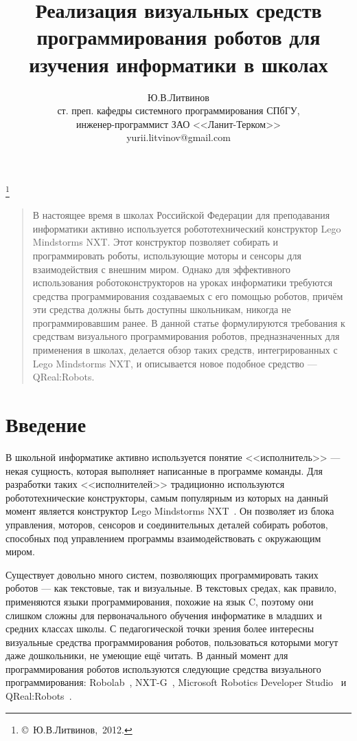 \documentclass[a4paper]{article}
\title{Реализация визуальных средств программирования роботов для изучения информатики в школах}
\author{Ю.В.Литвинов \\ ст. преп. кафедры системного программирования СПбГУ, \\ инженер-программист ЗАО <<Ланит-Терком>> \\ yurii.litvinov@gmail.com}
\date{}
\begin{document}
\maketitle
\thispagestyle{empty}

\renewcommand{\thefootnote}{}
\footnote{\small{\copyright~Ю.В.Литвинов,~2012.}}
\renewcommand{\thefootnote}{\arabic{footnote}}
\setcounter{footnote}{0}

\begin{quote}
\small\noindent
В настоящее время в школах Российской Федерации для преподавания информатики активно используется робототехнический конструктор Lego Mindstorms NXT. Этот конструктор позволяет собирать и программировать роботы, использующие моторы и сенсоры для взаимодействия с внешним миром. Однако для эффективного использования роботоконструкторов на уроках информатики требуются средства программирования создаваемых с его помощью роботов, причём эти средства должны быть доступны школьникам, никогда не программировавшим ранее. В данной статье формулируются требования к средствам визуального программирования роботов, предназначенных для применения в школах, делается обзор таких средств, интегрированных с  Lego Mindstorms NXT, и описывается новое подобное средство --- QReal:Robots.
\end{quote}

\section*{Введение}
В школьной информатике активно используется понятие <<исполнитель>> --- некая сущность, которая выполняет написанные в программе команды. Для разработки таких <<исполнителей>> традиционно используются робототехнические конструкторы, самым популярным из которых на данный момент является конструктор Lego Mindstorms NXT~\cite{legoNxt}. Он позволяет из блока управления, моторов, сенсоров и соединительных деталей собирать роботов, способных под управлением программы взаимодействовать с окружающим миром.

Существует довольно много систем, позволяющих программировать таких роботов --- как текстовые, так и визуальные. В текстовых средах, как правило, применяются языки программирования, похожие на язык C, поэтому они слишком сложны для первоначального обучения информатике в младших и средних классах школы. С педагогической точки зрения более интересны визуальные средства программирования роботов, пользоваться которыми могут даже дошкольники, не умеющие ещё читать. В данный момент для программирования роботов используются следующие средства визуального программирования: Robolab~\cite{robolab}, NXT-G~\cite{nxtG}, Microsoft Robotics Developer Studio~\cite{mrds} и QReal:Robots~\cite{robots}. 
\end{document}
